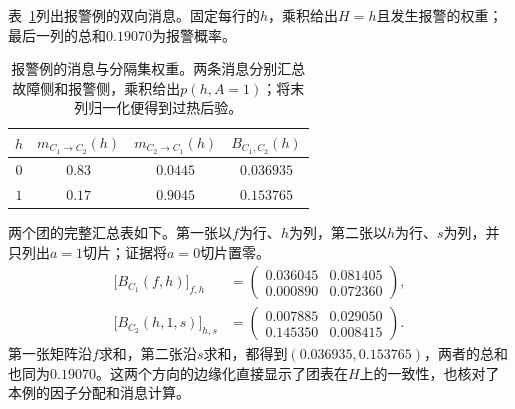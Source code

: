 表~\ref{tab:pgm-junction-tree-calibrated-separator}列出报警例的双向消息。固定每行的$h$，乘积给出$H=h$且发生报警的权重；最后一列的总和$0.19070$为报警概率。

\begin{table}[htbp]
  \centering
  \begin{tabular}{cccc}
    \toprule
    $h$ & $m_{C_1\to C_2}(h)$ & $m_{C_2\to C_1}(h)$ & $B_{C_1,C_2}(h)$\\
    \midrule
    $0$ & $0.83$ & $0.0445$ & $0.036935$\\
    $1$ & $0.17$ & $0.9045$ & $0.153765$\\
    \bottomrule
  \end{tabular}
  \caption{报警例的消息与分隔集权重。两条消息分别汇总故障侧和报警侧，乘积给出$p(h,A=1)$；将末列归一化便得到过热后验。}
  \label{tab:pgm-junction-tree-calibrated-separator}
\end{table}

两个团的完整汇总表如下。第一张以$f$为行、$h$为列，第二张以$h$为行、$s$为列，并只列出$a=1$切片；证据将$a=0$切片置零。
\begin{equation}
  \begin{aligned}
    \bigl[B_{C_1}(f,h)\bigr]_{f,h}
      &=\begin{pmatrix}
          0.036045&0.081405\\
          0.000890&0.072360
        \end{pmatrix},\\
    \bigl[B_{C_2}(h,1,s)\bigr]_{h,s}
      &=\begin{pmatrix}
          0.007885&0.029050\\
          0.145350&0.008415
        \end{pmatrix}.
  \end{aligned}
  \label{eq:pgm-junction-tree-device-calibrated-tables}
\end{equation}
第一张矩阵沿$f$求和，第二张沿$s$求和，都得到$(0.036935,0.153765)$，两者的总和也同为$0.19070$。这两个方向的边缘化直接显示了团表在$H$上的一致性，也核对了本例的因子分配和消息计算。

